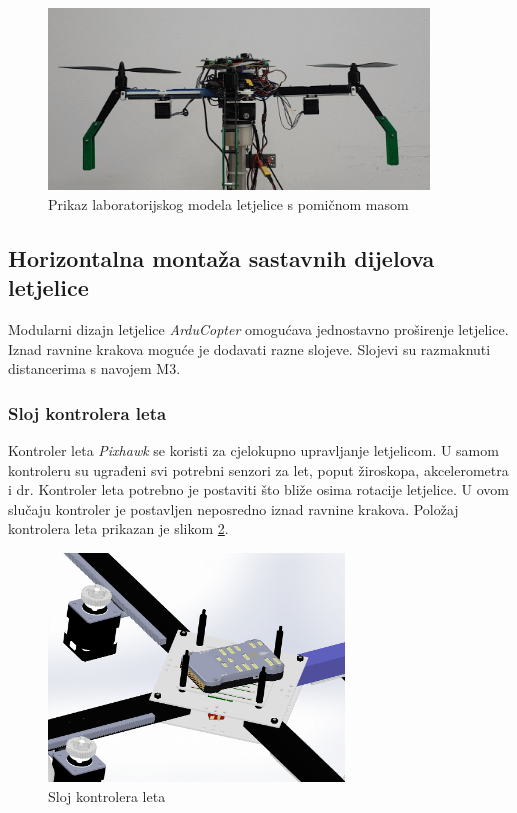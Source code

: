 \documentclass[11pt,a4paper]{article}
\begin{document}
\begin{figure}[H]
	\centering
	\includegraphics[width=0.9\textwidth]{figures/letjelica.png}
	\caption{Prikaz laboratorijskog modela letjelice s pomičnom masom}
	\label{fig:arm_assembly_Real}
\end{figure}



\subsection{Horizontalna montaža sastavnih dijelova letjelice}
Modularni dizajn letjelice \textit{ArduCopter} omogućava jednostavno proširenje letjelice. Iznad ravnine krakova moguće je dodavati razne slojeve. Slojevi su razmaknuti distancerima s navojem M3. 

\subsubsection{Sloj kontrolera leta}

Kontroler leta \textit{Pixhawk} se koristi za cjelokupno upravljanje letjelicom. U samom kontroleru su ugrađeni svi potrebni senzori za let, poput žiroskopa, akcelerometra i dr. Kontroler leta potrebno je postaviti što bliže osima rotacije letjelice. U ovom slučaju kontroler je postavljen neposredno iznad ravnine krakova. Položaj kontrolera leta prikazan je slikom \ref{fig:slot_pixhawk}.

\begin{figure}[H]
	\centering
	\includegraphics[width=0.7\textwidth]{figures/arducopter_slot_pixhawk.png}
	\caption{Sloj kontrolera leta}
	\label{fig:slot_pixhawk}
\end{figure}
\end{document}
